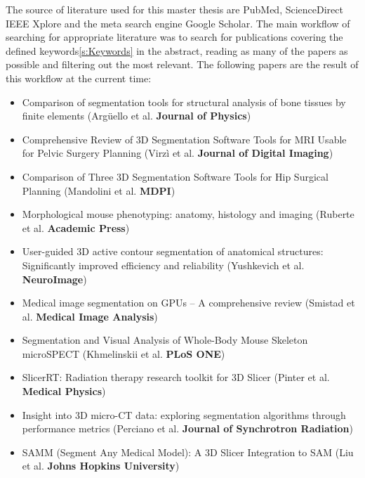 \begin{body}
The source of literature used for this master thesis are PubMed, ScienceDirect IEEE Xplore and the meta search engine Google Scholar. The main workflow of searching for appropriate literature was to search for publications covering the defined keywords\ref{s:Keywords} in the abstract, reading as many of the papers as possible and filtering out the most relevant.
The following papers are the result of this workflow at the current time:
\begin{itemize}
  \item[\ding{108}] Comparison of segmentation tools for structural analysis of bone tissues by finite elements (Argüello et al. \textsf{\textbf{Journal of Physics}})
  \item[\ding{108}] Comprehensive Review of 3D Segmentation Software Tools for MRI Usable for Pelvic Surgery Planning (Virzì et al. \textsf{\textbf{Journal of Digital Imaging}})
  \item[\ding{108}] Comparison of Three 3D Segmentation Software Tools for Hip Surgical Planning (Mandolini et al. \textsf{\bfseries{MDPI}})
  \item[\ding{108}] Morphological mouse phenotyping: anatomy, histology and imaging (Ruberte et al. \textsf{\bfseries{Academic Press}})
  \item[\ding{108}] User-guided 3D active contour segmentation of anatomical structures: Significantly improved efficiency and reliability (Yushkevich et al. \textsf{\bfseries{NeuroImage}})
  \item[\ding{108}] Medical image segmentation on GPUs – A comprehensive review (Smistad et al. \textsf{\bfseries{Medical Image Analysis}})
  \item[\ding{108}] Segmentation and Visual Analysis of Whole-Body Mouse Skeleton microSPECT (Khmelinskii et al. \textsf{\bfseries{PLoS ONE}})
  \item[\ding{108}] SlicerRT: Radiation therapy research toolkit for 3D Slicer (Pinter et al. \textsf{\bfseries{Medical Physics}})
  \item[\ding{108}] Insight into 3D micro-CT data: exploring segmentation algorithms through performance metrics (Perciano et al. \textsf{\bfseries{Journal of Synchrotron Radiation}})
  \item[\ding{108}] SAMM (Segment Any Medical Model): A 3D Slicer Integration to SAM (Liu et al. \textsf{\bfseries{Johns Hopkins University}})

\end{itemize}
\end{body}

